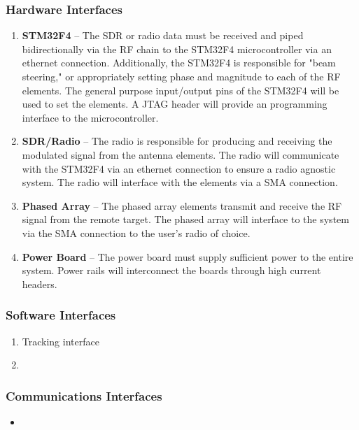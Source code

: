 \documentclass[ProjectRequirements.tex]{subfiles}
\begin{document}
		\subsubsection{Hardware Interfaces}
			\begin{enumerate}\itemsep1pt
				\item \textbf{STM32F4} -- The SDR or radio data must be received and piped bidirectionally via the RF chain to the STM32F4 microcontroller via an ethernet connection.  Additionally, the STM32F4 is responsible for "beam steering," or appropriately setting phase and magnitude to each of the RF elements.  The general purpose input/output pins of the STM32F4 will be used to set the elements. A JTAG header will provide an programming interface to the microcontroller.
				\item \textbf{SDR/Radio} -- The radio is responsible for producing and receiving the modulated signal from the antenna elements.  The radio will communicate with the STM32F4 via an ethernet connection to ensure a radio agnostic system.  The radio will interface with the elements via a SMA connection.  
				\item \textbf{Phased Array} -- The phased array elements transmit and receive the RF signal from the remote target.  The phased array will interface to the system via the SMA connection to the user's radio of choice.
				\item \textbf{Power Board} -- The power board must supply sufficient power to the entire system.  Power rails will interconnect the boards through high current headers.  
			\end{enumerate}
			
		\subsubsection{Software Interfaces}
			\begin{enumerate}\itemsep1pt
				\item Tracking interface
				\item 
			\end{enumerate}
			
		\subsubsection{Communications Interfaces}
			\begin{itemize}\itemsep1pt
				\item 
			\end{itemize}
			
\end{document}
